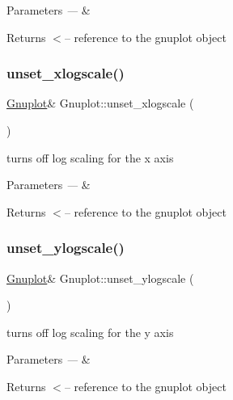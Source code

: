 \begin{DoxyParams}{Parameters}
{\em ---} & \\
\hline
\end{DoxyParams}
\begin{DoxyReturn}{Returns}
$<$-- reference to the gnuplot object 
\end{DoxyReturn}
\mbox{\label{class_gnuplot_a7b178184260f1498cd0c11a197ea0ac2}} 
\subsubsection{\texorpdfstring{unset\+\_\+xlogscale()}{unset\_xlogscale()}}
{\footnotesize\ttfamily \mbox{\hyperlink{class_gnuplot}{Gnuplot}}\& Gnuplot\+::unset\+\_\+xlogscale (\begin{DoxyParamCaption}{ }\end{DoxyParamCaption})\hspace{0.3cm}{\ttfamily [inline]}}

turns off log scaling for the x axis


\begin{DoxyParams}{Parameters}
{\em ---} & \\
\hline
\end{DoxyParams}
\begin{DoxyReturn}{Returns}
$<$-- reference to the gnuplot object 
\end{DoxyReturn}
\mbox{\label{class_gnuplot_a9217543dd49c4802b1194d42c5e10b6d}} 
\subsubsection{\texorpdfstring{unset\+\_\+ylogscale()}{unset\_ylogscale()}}
{\footnotesize\ttfamily \mbox{\hyperlink{class_gnuplot}{Gnuplot}}\& Gnuplot\+::unset\+\_\+ylogscale (\begin{DoxyParamCaption}{ }\end{DoxyParamCaption})\hspace{0.3cm}{\ttfamily [inline]}}

turns off log scaling for the y axis


\begin{DoxyParams}{Parameters}
{\em ---} & \\
\hline
\end{DoxyParams}
\begin{DoxyReturn}{Returns}
$<$-- reference to the gnuplot object 
\end{DoxyReturn}
\mbox{\label{class_gnuplot_afa67f022ca344593b054d7f2e3406c7e}} 
